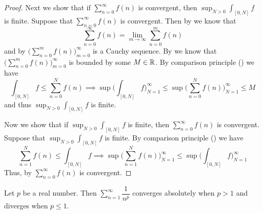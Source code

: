 \begin{proof}
  Next we show that if \(\sum_{n = 0}^\infty f(n)\) is convergent, then \(\sup_{N > 0} \int_{[0, N]} f\) is finite.
  Suppose that \(\sum_{n = 0}^\infty f(n)\) is convergent.
  Then by  we know that
  \[
    \sum_{n = 0}^\infty f(n) = \lim_{m \to \infty} \sum_{n = 0}^m f(n)
  \]
  and by  \(\big(\sum_{n = 0}^m f(n)\big)_{m = 0}^\infty\) is a Cauchy sequence.
  By  we know that \(\big(\sum_{n = 0}^m f(n)\big)_{m = 0}^\infty\) is bounded by some \(M \in \mathbb{R}\).
  By comparison principle () we have
  \[
    \int_{[0, N]} f \leq \sum_{n = 0}^N f(n) \implies \sup\bigg(\int_{[0, N]} f\bigg)_{N = 1}^\infty \leq \sup\bigg(\sum_{n = 0}^N f(n)\bigg)_{N = 1}^\infty \leq M
  \]
  and thus \(\sup_{N > 0} \int_{[0, N]} f\) is finite.

  Now we show that if \(\sup_{N > 0} \int_{[0, N]} f\) is finite, then \(\sum_{n = 0}^\infty f(n)\) is convergent.
  Suppose that \(\sup_{N > 0} \int_{[0, N]} f\) is finite.
  By comparison principle () we have
  \[
    \sum_{n = 1}^N f(n) \leq \int_{[0, N]} f \implies \sup\bigg(\sum_{n = 1}^N f(n)\bigg)_{N = 1}^\infty \leq \sup\bigg(\int_{[0, N]} f\bigg)_{N = 1}^\infty
  \]
  Thus, by  \(\sum_{n = 0}^\infty f(n)\) is convergent.
\end{proof}

\begin{cor}\label{i:11.6.5}
  Let \(p\) be a real number.
  Then \(\sum_{n = 1}^\infty \dfrac{1}{n^p}\) converges absolutely when \(p > 1\) and diverges when \(p \leq 1\).
\end{cor}

